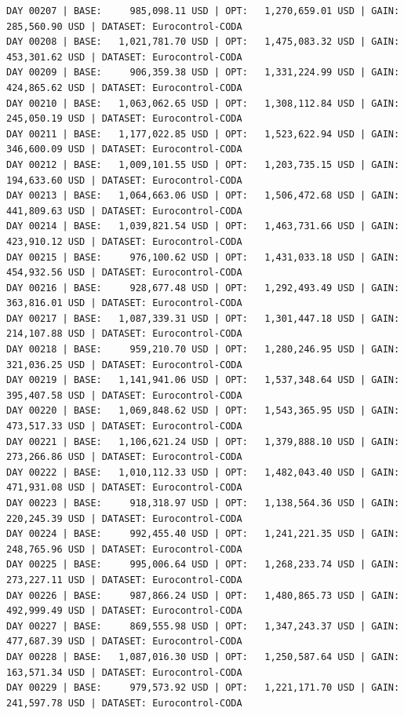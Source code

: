\documentclass[11pt,a4paper]{article}
\begin{document}
\begin{verbatim}
DAY 00207 | BASE:     985,098.11 USD | OPT:   1,270,659.01 USD | GAIN: 285,560.90 USD | DATASET: Eurocontrol-CODA
DAY 00208 | BASE:   1,021,781.70 USD | OPT:   1,475,083.32 USD | GAIN: 453,301.62 USD | DATASET: Eurocontrol-CODA
DAY 00209 | BASE:     906,359.38 USD | OPT:   1,331,224.99 USD | GAIN: 424,865.62 USD | DATASET: Eurocontrol-CODA
DAY 00210 | BASE:   1,063,062.65 USD | OPT:   1,308,112.84 USD | GAIN: 245,050.19 USD | DATASET: Eurocontrol-CODA
DAY 00211 | BASE:   1,177,022.85 USD | OPT:   1,523,622.94 USD | GAIN: 346,600.09 USD | DATASET: Eurocontrol-CODA
DAY 00212 | BASE:   1,009,101.55 USD | OPT:   1,203,735.15 USD | GAIN: 194,633.60 USD | DATASET: Eurocontrol-CODA
DAY 00213 | BASE:   1,064,663.06 USD | OPT:   1,506,472.68 USD | GAIN: 441,809.63 USD | DATASET: Eurocontrol-CODA
DAY 00214 | BASE:   1,039,821.54 USD | OPT:   1,463,731.66 USD | GAIN: 423,910.12 USD | DATASET: Eurocontrol-CODA
DAY 00215 | BASE:     976,100.62 USD | OPT:   1,431,033.18 USD | GAIN: 454,932.56 USD | DATASET: Eurocontrol-CODA
DAY 00216 | BASE:     928,677.48 USD | OPT:   1,292,493.49 USD | GAIN: 363,816.01 USD | DATASET: Eurocontrol-CODA
DAY 00217 | BASE:   1,087,339.31 USD | OPT:   1,301,447.18 USD | GAIN: 214,107.88 USD | DATASET: Eurocontrol-CODA
DAY 00218 | BASE:     959,210.70 USD | OPT:   1,280,246.95 USD | GAIN: 321,036.25 USD | DATASET: Eurocontrol-CODA
DAY 00219 | BASE:   1,141,941.06 USD | OPT:   1,537,348.64 USD | GAIN: 395,407.58 USD | DATASET: Eurocontrol-CODA
DAY 00220 | BASE:   1,069,848.62 USD | OPT:   1,543,365.95 USD | GAIN: 473,517.33 USD | DATASET: Eurocontrol-CODA
DAY 00221 | BASE:   1,106,621.24 USD | OPT:   1,379,888.10 USD | GAIN: 273,266.86 USD | DATASET: Eurocontrol-CODA
DAY 00222 | BASE:   1,010,112.33 USD | OPT:   1,482,043.40 USD | GAIN: 471,931.08 USD | DATASET: Eurocontrol-CODA
DAY 00223 | BASE:     918,318.97 USD | OPT:   1,138,564.36 USD | GAIN: 220,245.39 USD | DATASET: Eurocontrol-CODA
DAY 00224 | BASE:     992,455.40 USD | OPT:   1,241,221.35 USD | GAIN: 248,765.96 USD | DATASET: Eurocontrol-CODA
DAY 00225 | BASE:     995,006.64 USD | OPT:   1,268,233.74 USD | GAIN: 273,227.11 USD | DATASET: Eurocontrol-CODA
DAY 00226 | BASE:     987,866.24 USD | OPT:   1,480,865.73 USD | GAIN: 492,999.49 USD | DATASET: Eurocontrol-CODA
DAY 00227 | BASE:     869,555.98 USD | OPT:   1,347,243.37 USD | GAIN: 477,687.39 USD | DATASET: Eurocontrol-CODA
DAY 00228 | BASE:   1,087,016.30 USD | OPT:   1,250,587.64 USD | GAIN: 163,571.34 USD | DATASET: Eurocontrol-CODA
DAY 00229 | BASE:     979,573.92 USD | OPT:   1,221,171.70 USD | GAIN: 241,597.78 USD | DATASET: Eurocontrol-CODA

\end{verbatim}
\end{document}
